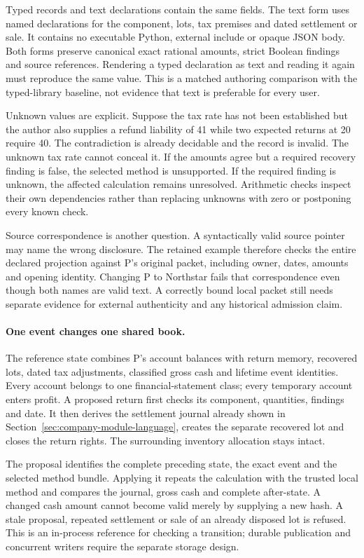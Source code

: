 Typed records and text declarations contain the same fields. The text form
uses named declarations for the component, lots, tax premises and dated
settlement or sale. It contains no executable Python, external include or
opaque JSON body. Both forms preserve canonical exact rational amounts, strict
Boolean findings and source references. Rendering a typed declaration as text
and reading it again must reproduce the same value. This is a matched
authoring comparison with the typed-library baseline, not evidence that text
is preferable for every user.

Unknown values are explicit. Suppose the tax rate has not been established
but the author also supplies a refund liability of 41 while two expected
returns at 20 require 40. The contradiction is already decidable and the
record is invalid. The unknown tax rate cannot conceal it. If the amounts
agree but a required recovery finding is false, the selected method is
unsupported. If the required finding is unknown, the affected calculation
remains unresolved. Arithmetic checks inspect their own dependencies rather
than replacing unknowns with zero or postponing every known check.

Source correspondence is another question. A syntactically valid source
pointer may name the wrong disclosure. The retained example therefore checks
the entire declared projection against P's original packet, including owner,
dates, amounts and opening identity. Changing P to Northstar fails that
correspondence even though both names are valid text. A correctly bound local
packet still needs separate evidence for external authenticity and any
historical admission claim.

\paragraph{One event changes one shared book.}
The reference state combines P's account balances with return memory,
recovered lots, dated tax adjustments, classified gross cash and lifetime
event identities. Every account belongs to one financial-statement class;
every temporary account enters profit. A proposed return first checks its
component, quantities, findings and date. It then derives the settlement
journal already shown in Section~\ref{sec:company-module-language}, creates
the separate recovered lot and closes the return rights. The surrounding
inventory allocation stays intact.

The proposal identifies the complete preceding state, the exact event and
the selected method bundle. Applying it repeats the calculation with the
trusted local method and compares the journal, gross cash and complete
after-state. A changed cash amount cannot become valid merely by supplying a
new hash. A stale proposal, repeated settlement or sale of an already disposed
lot is refused. This is an in-process reference for checking a transition;
durable publication and concurrent writers require the separate storage design.

